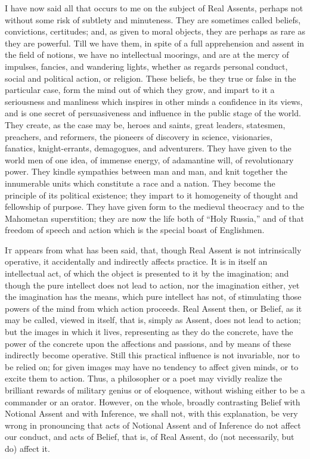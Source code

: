 I have now said all that occurs to me on the subject of Real
Assents, perhaps not without some risk of subtlety and minuteness.
They are sometimes called beliefs, convictions, certitudes; and, as
given to moral objects, they are perhaps as rare as they are
powerful. Till we have them, in spite of a full apprehension and
assent in the field of notions, we have no intellectual moorings, and
are at the mercy of impulses, fancies, and wandering lights, whether
as regards personal conduct, social and political action, or religion.
These beliefs, be they true or false in the particular case, form the
mind out of which they grow, and impart to it a seriousness and
manliness which inspires in other minds a confidence in its views, and
is one secret of persuasiveness and influence in the public stage of
the world. They create, as the case may be, heroes and saints, great
leaders, statesmen, preachers, and reformers, the pioneers of
discovery in science, visionaries, fanatics, knight-errants,
demagogues, and adventurers. They have given to the world men of one
idea, of immense energy, of adamantine will, of revolutionary power.
They kindle sympathies between man and man, and knit together the
innumerable units which constitute a race and a nation. They become
the principle of its political existence; they impart to it
homogeneity of thought and fellowship of purpose. They have given form
to the medieval theocracy and to the Mahometan superstition; they are
now the life both of ``Holy Russia,'' and of that freedom of
speech and action which is the special boast of Englishmen.


I\textsc{t} appears from what has been said, that, though Real Assent is not
intrinsically operative, it accidentally and indirectly affects
practice. It is in itself an intellectual act, of which the object is
presented to it by the imagination; and though the pure intellect does
not lead to action, nor the imagination either, yet the imagination
has the means, which pure intellect has not, of stimulating those
powers of the mind from which action proceeds. Real Assent then, or
Belief, as it may be called, viewed in itself, that is, simply as
Assent, does not lead to action; but the images in which it lives,
representing as they do the concrete, have the power of the concrete
upon the affections and passions, and by means of these indirectly
become operative. Still this practical influence is not invariable,
nor to be relied on; for given images may have no tendency to affect
given minds, or to excite them to action. Thus, a philosopher or a
poet may vividly realize the brilliant rewards of military genius or
of eloquence, without wishing either to be a commander or an orator.
However, on the whole, broadly contrasting Belief with Notional Assent
and with Inference, we shall not, with this explanation, be very
wrong in pronouncing that acts of Notional Assent and of Inference do
not affect our conduct, and acts of Belief, that is, of Real Assent,
do (not necessarily, but do) affect it.


